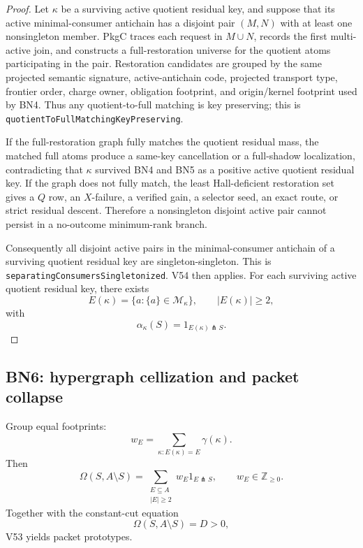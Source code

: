 \documentclass[10.5pt,a4paper]{article}
\newcommand{\cut}{\pitchfork}
\begin{document}
\begin{proof}
Let \(\kappa\) be a surviving active quotient residual key, and suppose that its active minimal-consumer antichain has a disjoint pair \((M,N)\) with at least one nonsingleton member.  PkgC traces each request in \(M\cup N\), records the first multi-active join, and constructs a full-restoration universe for the quotient atoms participating in the pair.  Restoration candidates are grouped by the same projected semantic signature, active-antichain code, projected transport type, frontier order, charge owner, obligation footprint, and origin/kernel footprint used by BN4.  Thus any quotient-to-full matching is key preserving; this is \texttt{quotientToFullMatchingKeyPreserving}.

If the full-restoration graph fully matches the quotient residual mass, the matched full atoms produce a same-key cancellation or a full-shadow localization, contradicting that \(\kappa\) survived BN4 and BN5 as a positive active quotient residual key.  If the graph does not fully match, the least Hall-deficient restoration set gives a \(Q\) row, an \(X\)-failure, a verified gain, a selector seed, an exact route, or strict residual descent.  Therefore a nonsingleton disjoint active pair cannot persist in a no-outcome minimum-rank branch.

Consequently all disjoint active pairs in the minimal-consumer antichain of a surviving quotient residual key are singleton-singleton.  This is \texttt{separatingConsumersSingletonized}.  V54 then applies.  For each surviving active quotient residual key, there exists
\[
E(\kappa)=\{a:\{a\}\in\mathcal M_\kappa\},\qquad |E(\kappa)|\ge2,
\]
with
\[
\alpha_\kappa(S)=1_{E(\kappa)\cut S}.
\]
\end{proof}

\subsection{BN6: hypergraph cellization and packet collapse}
Group equal footprints:
\[
w_E=\sum_{\kappa:E(\kappa)=E}\gamma(\kappa).
\]
Then
\[
\boxed{\Omega(S,A\setminus S)=
\sum_{\substack{E\subseteq A\\ |E|\ge2}}w_E1_{E\cut S},\qquad w_E\in\mathbb Z_{\ge0}.}
\]
Together with the constant-cut equation
\[
\Omega(S,A\setminus S)=D>0,
\]
V53 yields packet prototypes.
\end{document}
